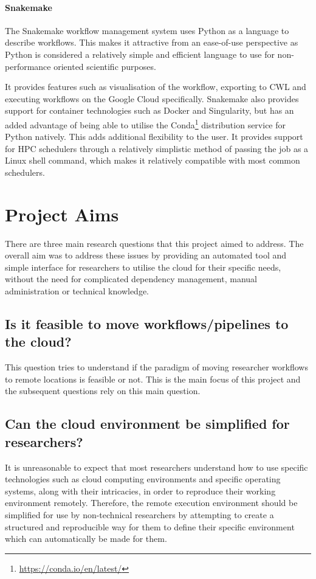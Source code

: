 \paragraph{Snakemake} The Snakemake workflow management system uses Python as a language to describe workflows. This makes it attractive from an ease-of-use perspective as Python is considered a relatively simple and efficient language to use for non-performance oriented scientific purposes\parencite{rashed2012python,muller2015python}.

It provides features such as visualisation of the workflow, exporting to CWL and executing workflows on the Google Cloud specifically. Snakemake also provides support for container technologies such as Docker and Singularity, but has an added advantage of being able to utilise the Conda\footnote{\url{https://conda.io/en/latest/}} distribution service for Python natively. This adds additional flexibility to the user. It provides support for HPC schedulers through a relatively simplistic method of passing the job as a Linux shell command, which makes it relatively compatible with most common schedulers.

\section{Project Aims}

There are three main research questions that this project aimed to address. The overall aim was to address these issues by providing an automated tool and simple interface for researchers to utilise the cloud for their specific needs, without the need for complicated dependency management, manual administration or technical knowledge.

\subsection{Is it feasible to move workflows/pipelines to the cloud?}
This question tries to understand if the paradigm of moving researcher workflows to remote locations is feasible or not. This is the main focus of this project and the subsequent questions rely on this main question.

\subsection{Can the cloud environment be simplified for researchers?}
It is unreasonable to expect that most researchers understand how to use specific technologies such as cloud computing environments and specific operating systems, along with their intricacies, in order to reproduce their working environment remotely. Therefore, the remote execution environment should be simplified for use by non-technical researchers by attempting to create a structured and reproducible way for them to define their specific environment which can automatically be made for them.

